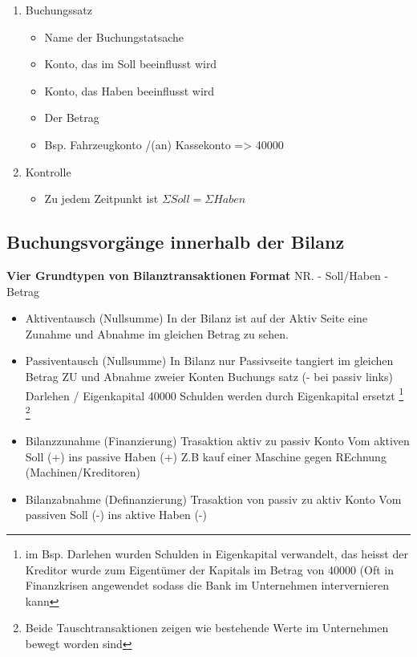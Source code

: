 \begin{enumerate}
\begin{enumerate}
\begin{itemize}
        \end{itemize}
        \item Buchungssatz
        \begin{itemize}
            \item Name der Buchungstatsache 
            \item Konto, das im Soll beeinflusst wird
            \item Konto, das Haben beeinflusst wird 
            \item Der Betrag
            \item Bsp. Fahrzeugkonto /(an) Kassekonto => 40000

        \end{itemize}
        \item Kontrolle 
        \begin{itemize}
            \item Zu jedem Zeitpunkt ist  $\Sigma Soll = \Sigma Haben$
        \end{itemize}
    \end{enumerate}
\end{enumerate}

\pagebreak
\subsection{Buchungsvorgänge innerhalb der Bilanz}

\textbf{Vier Grundtypen von Bilanztransaktionen}
\textbf{Format} NR. - Soll/Haben - Betrag
\begin{itemize}
    \item Aktiventausch (Nullsumme)
    \subitem In der Bilanz ist auf der Aktiv Seite eine Zunahme und Abnahme im gleichen Betrag zu sehen.
    \item Passiventausch (Nullsumme)
        \subitem In Bilanz nur Passivseite tangiert im gleichen Betrag ZU und Abnahme zweier Konten
        \subitem Buchungs satz (- bei passiv links) Darlehen / Eigenkapital 40000 
        \subitem Schulden werden durch Eigenkapital ersetzt 
        \footnote{ im Bsp. Darlehen wurden Schulden in Eigenkapital verwandelt, das heisst der Kreditor wurde zum Eigentümer der Kapitals im Betrag von 40000 (Oft in Finanzkrisen angewendet sodass die Bank im Unternehmen intervernieren kann}
        \footnote{Beide Tauschtransaktionen zeigen wie bestehende Werte im Unternehmen bewegt worden sind }
    \item Bilanzzunahme (Finanzierung)
        \subitem  Trasaktion aktiv zu passiv Konto 
        \subitem Vom aktiven Soll (+) ins passive Haben (+)
        \subitem Z.B kauf einer Maschine gegen REchnung (Machinen/Kreditoren)
    \item Bilanzabnahme (Definanzierung)
        \subitem Trasaktion von passiv zu aktiv Konto 
        \subitem Vom passiven Soll (-) ins aktive Haben (-)
\end{itemize}
\pagebreak

